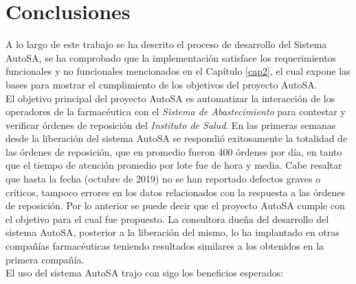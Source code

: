\chapter{Conclusiones}\label{cap5}

A lo largo de este trabajo se ha descrito el proceso de desarrollo del Sistema AutoSA, se ha comprobado que la implementación satisface los requerimientos funcionales y no funcionales mencionados en el Capítulo \ref{cap2}, el cual expone las bases para mostrar el cumplimiento de los objetivos del proyecto AutoSA.\\
El objetivo principal del proyecto AutoSA es automatizar la interacción de los operadores de la farmacéutica con el \textit{Sistema de Abastecimiento} para contestar y verificar órdenes de reposición del \textit{Instituto de Salud}. En las primeras semanas desde la liberación del sistema AutoSA se respondió exitosamente la totalidad de las órdenes de reposición, que en promedio fueron 400 órdenes por día, en tanto que el tiempo de atención promedio por lote fue de hora y media. Cabe resaltar que hasta la fecha (octubre de 2019) no se han reportado defectos graves o críticos, tampoco errores en los datos relacionados con la respuesta a las órdenes de reposición. Por lo anterior se puede decir que el proyecto AutoSA cumple con el objetivo para el cual fue propuesto. La consultora dueña del desarrollo del sistema AutoSA, posterior a la liberación del mismo, lo ha implantado en otras compañías farmacéuticas teniendo resultados similares a los obtenidos en la primera compañía.\\
El uso del sistema AutoSA trajo con sigo los beneficios esperados:
